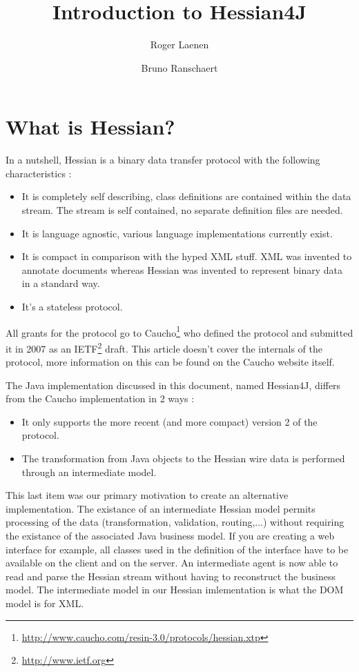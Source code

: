 \documentclass[a4paper]{article}
\title{Introduction to Hessian4J}
\author{Roger Laenen \and Bruno Ranschaert}
\begin{document}
\maketitle
\tableofcontents

\section{What is Hessian?}

In a nutshell, Hessian is a binary data transfer protocol with the following characteristics :

\begin{itemize}
	\item It is completely self describing, class definitions are contained within the data stream. The stream is self contained, no separate definition files are needed. 
	\item It is language agnostic, various language implementations currently exist. 
	\item It is compact in comparison with the hyped XML stuff. XML was invented to annotate documents whereas Hessian was invented to represent binary data in a standard way.
	\item It's a stateless protocol.
\end{itemize}

All grants for the protocol go to Caucho\footnote{\url{http://www.caucho.com/resin-3.0/protocols/hessian.xtp}} who defined the protocol and submitted it in 2007 as an IETF\footnote{\url{http://www.ietf.org}} draft. This article doesn't cover the internals of the protocol, more information on this can be found on the Caucho website itself.

The Java implementation discussed in this document, named Hessian4J, differs from the Caucho implementation in 2 ways :

\begin{itemize}
	\item It only supports the more recent (and more compact) version 2 of the protocol.
	\item The transformation from Java objects to the Hessian wire data is performed through an intermediate model. 
\end{itemize}

This last item was our primary motivation to create an alternative implementation. The existance of an intermediate Hessian model permits processing of the data (transformation, validation, routing,...) without requiring the existance of the associated Java business model. If you are creating a web interface for example, all classes used in the definition of the interface have to be available on the client and on the server. An intermediate agent is now able to read and parse the Hessian stream without having to reconstruct the business model. The intermediate model in our Hessian imlementation is what the DOM model is for XML.
\end{document}
